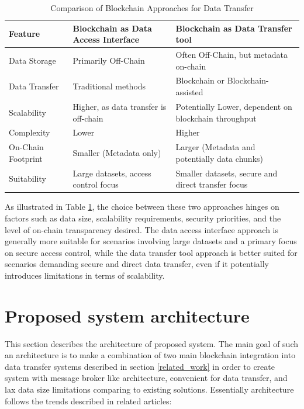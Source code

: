 \documentclass[10pt]{llncs}
\begin{document}
\begin{table}[h!]
\caption{Comparison of Blockchain Approaches for Data Transfer}
\label{tab:comparison}
\begin{tabular}{|p{20mm}|p{50mm}|p{50mm}|}
\hline
Feature & Blockchain as Data Access Interface & Blockchain as Data Transfer tool \\ \hline
Data Storage & Primarily Off-Chain & Often Off-Chain, but metadata on-chain \\ \hline
Data Transfer & Traditional methods & Blockchain or Blockchain-assisted \\ \hline
Scalability & Higher, as data transfer is off-chain & Potentially Lower, dependent on blockchain throughput \\ \hline
Complexity & Lower & Higher \\ \hline
On-Chain Footprint & Smaller (Metadata only) & Larger (Metadata and potentially data chunks) \\ \hline
Suitability & Large datasets, access control focus & Smaller datasets, secure and direct transfer focus \\ \hline
\end{tabular}

\end{table}

As illustrated in Table \ref{tab:comparison}, the choice between these two approaches hinges on factors such as data size, scalability requirements, security priorities, 
and the level of on-chain transparency desired. 
The data access interface approach is generally more suitable for scenarios involving large datasets and a primary focus on secure access control, while the data transfer tool 
approach is better suited for scenarios demanding secure and direct data transfer, even if it potentially introduces limitations in terms of scalability.

\section{Proposed system architecture} \label{architecture}

This section describes the architecture of proposed system.
The main goal of such an architecture is to make a combination of two main blockchain integration into data transfer systems described in section \ref{related_work}
in order to create system with message broker like architecture, convenient for data transfer, and lax data size limitations comparing to existing solutions.
Essentially architecture follows the trends described in related articles:
\end{document}

